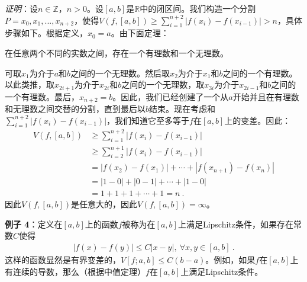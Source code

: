 \textsl{证明}：设$n\in\mathbb{Z}$，$n>0$。设$[a,b]$是$\mathbb{R}$中的闭区间。我们构造一个分割$P={x_{0},x_{1},...,x_{n+2}}$，使得$V(f,[a,b])\geq\sum_{i=1}^{n+2}|f(x_{i})-f(x_{i-1})|>n$，具体步骤如下。根据定义，$x_{0}=a$。由下面定理：
\begin{theorem}{在任意两个不同的实数之间，存在一个有理数和一个无理数。}
\end{theorem}
可取$x_{1}$为介于$a$和$b$之间的一个无理数。然后取$x_{2}$为介于$x_{1}$和$b$之间的一个有理数。以此类推，取$x_{2i+1}$为介于$x_{2i}$和$b$之间的一个无理数，取$x_{3i}$为介于$x_{2i-1}$和$b$之间的一个有理数。最后，$x_{n+2}=b$。因此，我们已经创建了一个从$a$开始并且在有理数和无理数之间交替的分割，直到最后以$b$结束。现在考虑和$\sum_{i=1}^{n+2}|f(x_{i})-f(x_{i-1})|$，我们知道它至多等于$f$在$[a,b]$上的变差。因此：
\begin{align} 
V(f,[a,b])&\geq\sum_{i=1}^{n+2}|f(x_{i})-f(x_{i-1})| \\ &\geq\sum_{i=2}^{n+1}|f(x_{i})-f(x_{i-1})| \\ &=|f(x_{2})-f(x_{1})|+\cdots+|f(x_{n+1})-f(x_{n})| \\ &=|1-0|+|0-1|+\cdots+|1-0| \\ &=1+1+1+\cdots+1=n ~. 
\end{align}
因此$V(f,[a,b])$是任意大的，因此$V(f,[a,b])=\infty$。

\textbf{例子 4}：定义在$[a,b]$上的函数$f$被称为在$[a,b]$上满足Lipschitz条件，如果存在常数$C$使得
\begin{align} 
|f(x)-f(y)|\leq C|x-y|, \
\forall x,y\in[a,b]~.
\end{align}
这样的函数显然是有界变差的，$V[f;a,b]\leq C(b-a)$。例如，如果$f$在$[a,b]$上有连续的导数，那么（根据中值定理）$f$在$[a,b]$上满足Lipschitz条件。

